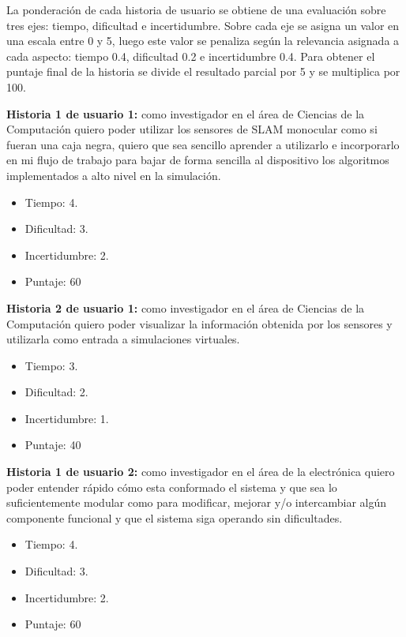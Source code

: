 \documentclass[
11pt, %
codirector, %
]{charter}
\begin{document}
La ponderación de cada historia de usuario se obtiene de una evaluación sobre tres ejes: tiempo, dificultad e incertidumbre. Sobre cada eje se asigna un valor en una escala entre 0 y 5, luego este valor se penaliza según la relevancia asignada a cada aspecto: tiempo 0.4, dificultad 0.2 e incertidumbre 0.4. Para obtener el puntaje final de la historia se divide el resultado parcial por 5 y se multiplica por 100.

\newpage
\textbf{Historia 1 de usuario 1:} como investigador en el área de Ciencias de la Computación quiero poder utilizar los sensores de SLAM monocular como si fueran una caja negra, quiero que sea sencillo aprender a utilizarlo e incorporarlo en mi flujo de trabajo para bajar de forma sencilla al dispositivo los algoritmos implementados a alto nivel en la simulación.

\begin{itemize}
	\item Tiempo: 4.
	\item Dificultad: 3.
	\item Incertidumbre: 2.
	\item Puntaje: 60 
\end{itemize}

\textbf{Historia 2 de usuario 1:} como investigador en el área de Ciencias de la Computación quiero poder visualizar la información obtenida por los sensores y utilizarla como entrada a simulaciones virtuales.

\begin{itemize}
	\item Tiempo: 3.
	\item Dificultad: 2.
	\item Incertidumbre: 1.
	\item Puntaje: 40 
\end{itemize}

\textbf{Historia 1 de usuario 2:} como investigador en el área de la electrónica quiero poder entender rápido cómo esta conformado el sistema y que sea lo suficientemente modular como para modificar, mejorar y/o intercambiar algún componente funcional y que el sistema siga operando sin dificultades.

\begin{itemize}
	\item Tiempo: 4.
	\item Dificultad: 3.
	\item Incertidumbre: 2.
	\item Puntaje: 60
\end{itemize}
\end{document}

